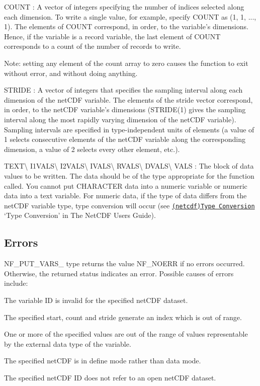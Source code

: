 {\ttfamily C\+O\+U\+NT} \+: A vector of integers specifying the number of indices selected along each dimension. To write a single value, for example, specify C\+O\+U\+NT as (1, 1, ..., 1). The elements of C\+O\+U\+NT correspond, in order, to the variable’s dimensions. Hence, if the variable is a record variable, the last element of C\+O\+U\+NT corresponds to a count of the number of records to write.

Note\+: setting any element of the count array to zero causes the function to exit without error, and without doing anything.

{\ttfamily S\+T\+R\+I\+DE} \+: A vector of integers that specifies the sampling interval along each dimension of the net\+C\+DF variable. The elements of the stride vector correspond, in order, to the net\+C\+DF variable’s dimensions (S\+T\+R\+I\+D\+E(1) gives the sampling interval along the most rapidly varying dimension of the net\+C\+DF variable). Sampling intervals are specified in type-\/independent units of elements (a value of 1 selects consecutive elements of the net\+C\+DF variable along the corresponding dimension, a value of 2 selects every other element, etc.).

{\ttfamily T\+E\+XT}\textbackslash{} {\ttfamily I1\+V\+A\+LS}\textbackslash{} {\ttfamily I2\+V\+A\+LS}\textbackslash{} {\ttfamily I\+V\+A\+LS}\textbackslash{} {\ttfamily R\+V\+A\+LS}\textbackslash{} {\ttfamily D\+V\+A\+LS}\textbackslash{} {\ttfamily V\+A\+LS} \+: The block of data values to be written. The data should be of the type appropriate for the function called. You cannot put C\+H\+A\+R\+A\+C\+T\+ER data into a numeric variable or numeric data into a text variable. For numeric data, if the type of data differs from the net\+C\+DF variable type, type conversion will occur (see \href{netcdf.html#Type-Conversion}{\tt (netcdf)Type Conversion} ‘\+Type Conversion’ in The Net\+C\+DF Users Guide).

\subsection*{Errors }

N\+F\+\_\+\+P\+U\+T\+\_\+\+V\+A\+R\+S\+\_\+ type returns the value N\+F\+\_\+\+N\+O\+E\+RR if no errors occurred. Otherwise, the returned status indicates an error. Possible causes of errors include\+:


\begin{DoxyItemize}
\item The variable ID is invalid for the specified net\+C\+DF dataset.
\item The specified start, count and stride generate an index which is out of range.
\item One or more of the specified values are out of the range of values representable by the external data type of the variable.
\item The specified net\+C\+DF is in define mode rather than data mode.
\item The specified net\+C\+DF ID does not refer to an open net\+C\+DF dataset.
\end{DoxyItemize}

